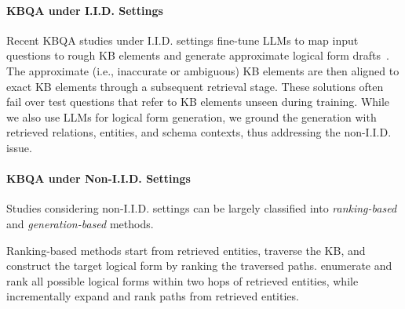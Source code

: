 \paragraph{KBQA under I.I.D. Settings}

Recent KBQA studies under I.I.D. settings fine-tune LLMs to map input questions to rough KB elements and generate approximate logical form drafts~\cite{luo_chatkbqa_2024, wang_no_2024}. %
The approximate (i.e., inaccurate or ambiguous) KB elements are then aligned to exact KB elements through a subsequent retrieval stage. These solutions often fail over test questions that refer to KB elements unseen during training. While we also use LLMs for logical form generation, we ground the generation with retrieved relations, entities, and  schema contexts, thus addressing the non-I.I.D. issue. 


\paragraph{KBQA under Non-I.I.D. Settings}

Studies considering non-I.I.D. settings can be largely classified into \emph{ranking-based} and \emph{generation-based} methods. 

Ranking-based methods start from retrieved entities, traverse the KB, and construct the target logical form by ranking the traversed paths.  
\citet{gu_beyond_2021} enumerate and rank all possible logical forms within two hops  of retrieved entities, while \citet{gu_dont_2023} incrementally expand and rank paths from retrieved entities. %


